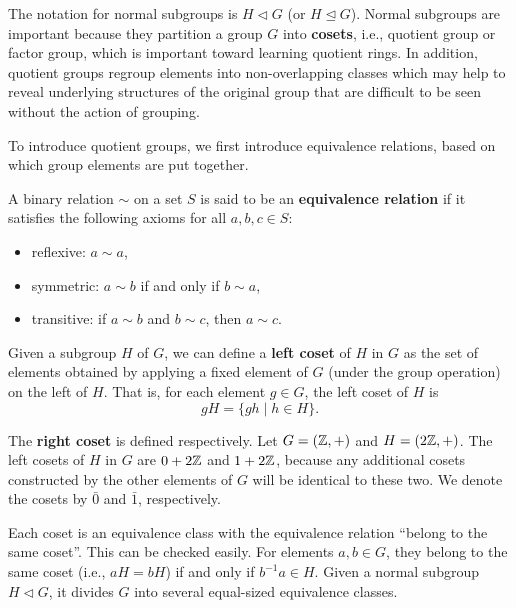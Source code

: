 \documentclass[../main.tex]{subfiles}
\begin{document}
The notation for normal subgroups is $H \triangleleft G$ (or $H \trianglelefteq G$). Normal
subgroups are important because they partition a group $G$ into \textbf{cosets}, i.e.,
quotient group or factor group, which is important toward learning quotient rings. In addition, quotient groups regroup elements into non-overlapping classes which may help to reveal underlying structures of the original group that are difficult to be seen without the action of grouping.  

To introduce quotient groups, we first introduce equivalence relations, based on which group elements are put together. 

\begin{definition}
A binary relation $\sim$ on a set $S$ is said to be an \textbf{equivalence relation} if it satisfies the following axioms for all $a,b,c \in S$:
\begin{itemize}
    \item reflexive: $a \sim a$,
    \item symmetric: $a \sim b$ if and only if $b \sim a$,
    \item transitive: if $a \sim b$ and $b \sim c$, then $a \sim c$.
\end{itemize}
\end{definition}


\begin{definition}
Given a subgroup $H$ of $G$, we can define a \textbf{left coset}\reversemarginpar
{} of $H$ in $G$ as the set of elements obtained by applying a fixed element of $G$ (under the group operation) on the left of $H$. That is,  for each element $g \in G$, the left coset of $H$ is 
\begin{equation*}
    gH = \{gh \mid h \in H\}. 
\end{equation*}
\end{definition}

The \textbf{right coset} is defined respectively. Let $G=(\mathbb{Z},+)$ and $H=(2\mathbb{Z},+)$. The left
\reversemarginpar
{}
cosets of $H$ in $G$ are $0+2\mathbb{Z}$ and $1+2\mathbb{Z}$, because any additional cosets constructed by the other elements of $G$ will be identical to these two. We denote the cosets by $\bar{0}$ and $\bar{1}$, respectively. 

Each coset is an equivalence class with the equivalence relation ``belong to the same coset''. This can be checked easily. For elements $a,b \in G$, they belong to the same coset (i.e., $aH=bH$) if and only if $b^{-1}a \in H$. Given a normal subgroup $H \triangleleft G$, it divides $G$ into several equal-sized equivalence classes. 
\end{document}
